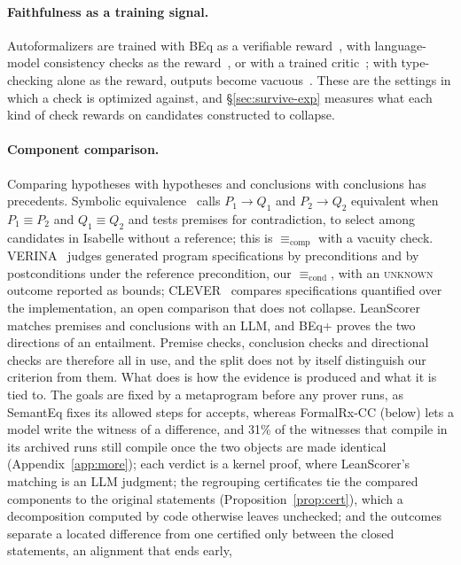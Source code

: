 \documentclass[10pt]{article}
\theoremstyle{definition}
\newcommand{\Econd}{\mathrel{\equiv_{\mathrm{cond}}}}
\newcommand{\Ecomp}{\mathrel{\equiv_{\mathrm{comp}}}}
\newcommand{\V}[1]{\textsc{#1}}
\begin{document}
\paragraph{Faithfulness as a training signal.} Autoformalizers are trained with BEq as a
verifiable reward~\cite{stepfun}, with language-model consistency checks as the
reward~\cite{formarl,reform}, or with a trained critic~\cite{criticlean}; with type-checking alone as
the reward, outputs become vacuous~\cite{onlinerl}. These are the settings in which a check is
optimized against, and \S\ref{sec:survive-exp} measures what each kind of check rewards on
candidates constructed to collapse.

\paragraph{Component comparison.} Comparing hypotheses with hypotheses and conclusions with
conclusions has precedents. Symbolic equivalence~\cite{symeq} calls $P_1\to Q_1$ and $P_2\to Q_2$
equivalent when $P_1\equiv P_2$ and $Q_1\equiv Q_2$ and tests premises for contradiction, to
select among candidates in Isabelle without a reference; this is $\Ecomp$ with a vacuity check.
VERINA~\cite{verina} judges generated program specifications by preconditions and by
postconditions under the reference precondition, our $\Econd$, with an \V{unknown} outcome
reported as bounds; CLEVER~\cite{clever} compares specifications quantified over the
implementation, an open comparison that does not collapse. LeanScorer~\cite{mathesis} matches
premises and conclusions with an LLM, and BEq+ proves the two directions of an entailment.
Premise checks, conclusion checks and directional checks are therefore all in use, and the split
does not by itself distinguish our criterion from them. What does is how the evidence is
produced and what it is tied to. The goals are fixed by a metaprogram before any prover runs, as
SemantEq fixes its allowed steps for accepts, whereas FormalRx-CC (below) lets a model write the
witness of a difference, and 31\% of the
witnesses that compile in its archived runs still compile once the two objects are made
identical (Appendix~\ref{app:more}); each verdict is a kernel proof, where LeanScorer's matching
is an LLM judgment; the regrouping certificates tie
the compared components to the original statements (Proposition~\ref{prop:cert}), which a
decomposition computed by code otherwise leaves unchecked; and the outcomes separate a located
difference from one certified only between the closed statements, an alignment that ends early,
\end{document}
